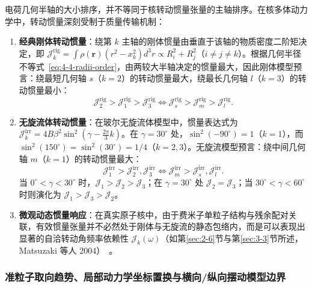 电荷几何半轴的大小排序，并不等同于核转动惯量张量的主轴排序。在核多体动力学中，转动惯量深刻受制于质量传输机制：
\begin{enumerate}
\item \textbf{经典刚体转动惯量}：绕第 $k$ 主轴的刚体惯量由垂直于该轴的物质密度二阶矩决定，即 $\mathcal{J}_k^{\text{rig}} = \int \rho(\mathbf{r}) (r^2 - x_k^2) d^3r \propto R_i^2 + R_j^2$（$i \ne j \ne k$）。根据几何半径不等式~\eqref{eq:4-4-radii-order}，由两较大半轴决定的惯量最大，因此刚体模型预言：绕最短几何轴 $s$（$k=2$）的转动惯量最大，绕最长几何轴 $l$（$k=3$）的转动惯量最小：
\begin{equation}\label{eq:4-4-rigid-order}
\mathcal{J}_2^{\text{rig}} > \mathcal{J}_1^{\text{rig}} > \mathcal{J}_3^{\text{rig}} \iff \mathcal{J}_s^{\text{rig}} > \mathcal{J}_m^{\text{rig}} > \mathcal{J}_l^{\text{rig}}.
\end{equation}
\item \textbf{无旋流体转动惯量}：在玻尔无旋流体模型中，惯量表达式为 $\mathcal{J}_k^{\text{irr}} = 4 B \beta^2 \sin^2\left(\gamma - \frac{2\pi}{3} k\right)$。在 $\gamma = 30^\circ$ 处，$\sin^2(-90^\circ) = 1$（$k=1$），而 $\sin^2(150^\circ) = \sin^2(30^\circ) = 1/4$（$k=2, 3$）。无旋流模型预言：绕中间几何轴 $m$（$k=1$）的转动惯量最大：
\begin{equation}\label{eq:4-4-irrot-order}
\mathcal{J}_1^{\text{irr}} > \mathcal{J}_2^{\text{irr}}, \mathcal{J}_3^{\text{irr}} \iff \mathcal{J}_m^{\text{irr}} > \mathcal{J}_s^{\text{irr}}, \mathcal{J}_l^{\text{irr}}.
\end{equation}
当 $0^\circ < \gamma < 30^\circ$ 时，$\mathcal{J}_1 > \mathcal{J}_2 > \mathcal{J}_3$；在 $\gamma = 30^\circ$ 处 $\mathcal{J}_2 = \mathcal{J}_3$；当 $30^\circ < \gamma < 60^\circ$ 时则演化为 $\mathcal{J}_1 > \mathcal{J}_3 > \mathcal{J}_2$。
\item \textbf{微观动态惯量响应}：在真实原子核中，由于费米子单粒子结构与残余配对关联，有效惯量张量并不必然处于刚体与无旋流的静态包络内，而是可以表现出显著的自洽转动角频率依赖性 $\mathcal{J}_k(\omega)$（如第\ref{sec:2-6}节与第\ref{sec:3-3}节所述，Matsuzaki 等人 2004）~\cite{matsuzaki-2004-nuclear-inertia-and-wobbling}。
\end{enumerate}

\subsubsection{准粒子取向趋势、局部动力学坐标置换与横向/纵向摆动模型边界}


